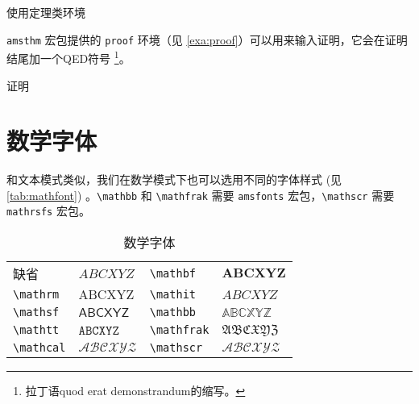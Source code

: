 \begin{example}[h]
\caption{使用定理类环境}
\label{exa:use_theorem}
\end{example}

\texttt{amsthm} 宏包提供的 \texttt{proof} 环境（见 \autoref{exa:proof}）可以用来输入证明，它会在证明结尾加一个QED符号 \footnote{拉丁语quod erat demonstrandum的缩写。}。


\begin{example}[h]
\caption{证明}
\label{exa:proof}
\end{example}

\section{数学字体}

和文本模式类似，我们在数学模式下也可以选用不同的字体样式 (见 \autoref{tab:mathfont}) 
。\verb|\mathbb| 和 \verb|\mathfrak| 需要 \texttt{amsfonts} 宏包，\verb|\mathscr| 需要 \texttt{mathrsfs} 宏包。

\begin{table}[htbp]
\caption{数学字体}
\label{tab:mathfont}
\centering
\begin{tabular}{llll}
    \toprule
    缺省 & $ABCXYZ$ & 
    \verb|\mathbf| & $\mathbf{ABCXYZ}$ \\
    \verb|\mathrm| & $\mathrm{ABCXYZ}$ & 
    \verb|\mathit| & $\mathit{ABCXYZ}$ \\
    \verb|\mathsf| & $\mathsf{ABCXYZ}$ & 
    \verb|\mathbb| & $\mathbb{ABCXYZ}$ \\
    \verb|\mathtt| & $\mathtt{ABCXYZ}$ & 
    \verb|\mathfrak| & $\mathfrak{ABCXYZ}$ \\
    \verb|\mathcal| & $\mathcal{ABCXYZ}$ & 
    \verb|\mathscr| & $\mathscr{ABCXYZ}$ \\
    \bottomrule
\end{tabular}
\end{table}



